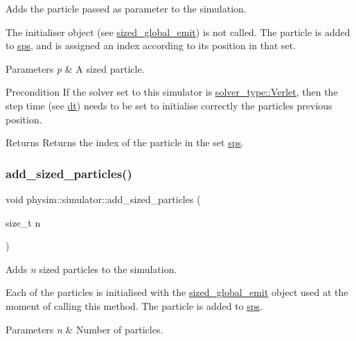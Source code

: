 Adds the particle passed as parameter to the simulation. 

The initialiser object (see \hyperlink{classphysim_1_1simulator_a61d4f20480309e95fce1db56b7fc8a88}{sized\+\_\+global\+\_\+emit}) is not called. The particle is added to \hyperlink{classphysim_1_1simulator_ad3bc00314e9fd8435125ff1225c0658b}{sps}, and is assigned an index according to its position in that set. 
\begin{DoxyParams}{Parameters}
{\em p} & A sized particle. \\
\hline
\end{DoxyParams}
\begin{DoxyPrecond}{Precondition}
If the solver set to this simulator is \hyperlink{namespacephysim_a09adeda29c09e651877e880d31fc9686ac1f9df543f33d8a79fb2437c853f09b9}{solver\+\_\+type\+::\+Verlet}, then the step time (see \hyperlink{classphysim_1_1simulator_a12a60d0ed819937b51ce50162dbdd6e1}{dt}) needs to be set to initialise correctly the particle\textquotesingle{}s previous position. 
\end{DoxyPrecond}
\begin{DoxyReturn}{Returns}
Returns the index of the particle in the set \hyperlink{classphysim_1_1simulator_ad3bc00314e9fd8435125ff1225c0658b}{sps}. 
\end{DoxyReturn}
\mbox{\label{classphysim_1_1simulator_ae0551469d3c6b536da89bce04ff93fee}} 
\subsubsection{\texorpdfstring{add\+\_\+sized\+\_\+particles()}{add\_sized\_particles()}}
{\footnotesize\ttfamily void physim\+::simulator\+::add\+\_\+sized\+\_\+particles (\begin{DoxyParamCaption}\item[{size\+\_\+t}]{n }\end{DoxyParamCaption})}



Adds {\itshape n} sized particles to the simulation. 

Each of the particles is initialised with the \hyperlink{classphysim_1_1simulator_a61d4f20480309e95fce1db56b7fc8a88}{sized\+\_\+global\+\_\+emit} object used at the moment of calling this method. The particle is added to \hyperlink{classphysim_1_1simulator_ad3bc00314e9fd8435125ff1225c0658b}{sps}. 
\begin{DoxyParams}{Parameters}
{\em n} & Number of particles. \\
\hline
\end{DoxyParams}
\mbox{\label{classphysim_1_1simulator_a551890b383f97f13bb429e40f72c6c33}} 
